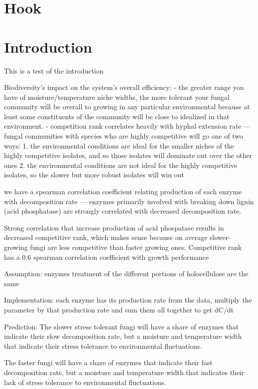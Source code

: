 \documentclass[12pt]{article}
\begin{document}
\begin{multicols}{2}
\section{Hook}
\lipsum[1]

\section{Introduction}
This is a test of the introduction \cite{Du2019}

Biodiversity's impact on the system's overall efficiency:
- the greater range you have of moisture/temperature niche widths, the more tolerant your fungal community will be overall to growing in any particular environmental because at least some constituents of the community will be close to idealized in that environment.
- competition rank correlates heavily with hyphal extension rate — fungal communities with species who are highly competitive will go one of two ways: 1. the environmental conditions are ideal for the smaller niches of the highly competitive isolates, and so those isolates will dominate out over the other ones 2. the environmental conditions are not ideal for the highly competitive isolates, so the slower but more robust isolates will win out

we have a spearman correlation coefficient relating production of each enzyme with decomposition rate — enzymes primarily involved with breaking down lignin (acid phosphatase) are strongly correlated with decreased decomposition rate.

Strong correlation that increase production of acid phospatase results in decreased competitive rank, which makes sense because on average slower-growing fungi are less competitive than faster growing ones. Competitive rank has a 0.6 spearman correlation coefficient with growth performance

Assumption: enzymes treatment of the different portions of holocellulose are the same 

Implementation: each enzyme has its production rate from the data, multiply the parameter by that production rate and sum them all together to get dC/dt


Prediction:
The slower stress tolerant fungi will have a share of enzymes that indicate their slow decomposition rate, but a moisture and temperature width that indicate their stress tolerance to environmental fluctuations. 

The faster fungi will have a share of enzymes that indicate their fast decomposition rate, but a moisture and temperature width that indicates their lack of stress tolerance to environmental fluctuations.


\end{multicols}
\end{document}
